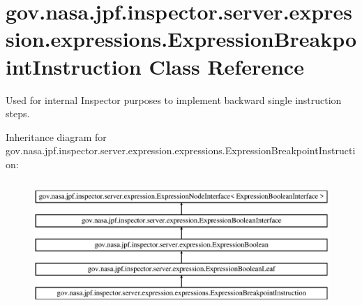\hypertarget{classgov_1_1nasa_1_1jpf_1_1inspector_1_1server_1_1expression_1_1expressions_1_1_expression_breakpoint_instruction}{}\section{gov.\+nasa.\+jpf.\+inspector.\+server.\+expression.\+expressions.\+Expression\+Breakpoint\+Instruction Class Reference}
\label{classgov_1_1nasa_1_1jpf_1_1inspector_1_1server_1_1expression_1_1expressions_1_1_expression_breakpoint_instruction}


Used for internal Inspector purposes to implement backward single instruction steps.  


Inheritance diagram for gov.\+nasa.\+jpf.\+inspector.\+server.\+expression.\+expressions.\+Expression\+Breakpoint\+Instruction\+:\begin{figure}[H]
\begin{center}
\leavevmode
\includegraphics[height=4.827586cm]{classgov_1_1nasa_1_1jpf_1_1inspector_1_1server_1_1expression_1_1expressions_1_1_expression_breakpoint_instruction}
\end{center}
\end{figure}
